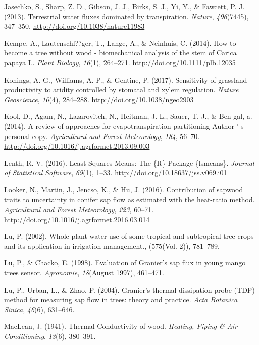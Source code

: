\documentclass[11pt,twoside]{reedthesis}
\begin{document}
\hypertarget{ref-Jasechko2013}{}
Jasechko, S., Sharp, Z. D., Gibson, J. J., Birks, S. J., Yi, Y., \&
Fawcett, P. J. (2013). Terrestrial water fluxes dominated by
transpiration. \emph{Nature}, \emph{496}(7445), 347--350.
\url{http://doi.org/10.1038/nature11983}

\hypertarget{ref-Kempe2014}{}
Kempe, A., Lautenschl??ger, T., Lange, A., \& Neinhuis, C. (2014). How
to become a tree without wood - biomechanical analysis of the stem of
Carica papaya L. \emph{Plant Biology}, \emph{16}(1), 264--271.
\url{http://doi.org/10.1111/plb.12035}

\hypertarget{ref-Konings2017}{}
Konings, A. G., Williams, A. P., \& Gentine, P. (2017). Sensitivity of
grassland productivity to aridity controlled by stomatal and xylem
regulation. \emph{Nature Geoscience}, \emph{10}(4), 284--288.
\url{http://doi.org/10.1038/ngeo2903}

\hypertarget{ref-Kool2014}{}
Kool, D., Agam, N., Lazarovitch, N., Heitman, J. L., Sauer, T. J., \&
Ben-gal, a. (2014). A review of approaches for evapotranspiration
partitioning Author ' s personal copy. \emph{Agricultural and Forest
Meteorology}, \emph{184}, 56--70.
\url{http://doi.org/10.1016/j.agrformet.2013.09.003}

\hypertarget{ref-Lenth2016}{}
Lenth, R. V. (2016). Least-Squares Means: The \{R\} Package \{lsmeans\}.
\emph{Journal of Statistical Software}, \emph{69}(1), 1--33.
\url{http://doi.org/10.18637/jss.v069.i01}

\hypertarget{ref-Looker2016}{}
Looker, N., Martin, J., Jencso, K., \& Hu, J. (2016). Contribution of
sapwood traits to uncertainty in conifer sap flow as estimated with the
heat-ratio method. \emph{Agricultural and Forest Meteorology},
\emph{223}, 60--71. \url{http://doi.org/10.1016/j.agrformet.2016.03.014}

\hypertarget{ref-Lu2002}{}
Lu, P. (2002). Whole-plant water use of some tropical and subtropical
tree crops and its application in irrigation management., (575(Vol. 2)),
781--789.

\hypertarget{ref-Lu1998}{}
Lu, P., \& Chacko, E. (1998). Evaluation of Granier's sap flux in young
mango trees sensor. \emph{Agronomie}, \emph{18}(August 1997), 461--471.

\hypertarget{ref-Lu2004}{}
Lu, P., Urban, L., \& Zhao, P. (2004). Granier's thermal dissipation
probe (TDP) method for measuring sap flow in trees: theory and practice.
\emph{Acta Botanica Sinica}, \emph{46}(6), 631--646.

\hypertarget{ref-MacLean1941}{}
MacLean, J. (1941). Thermal Conductivity of wood. \emph{Heating, Piping
\& Air Conditioning}, \emph{13}(6), 380--391.
\end{document}
